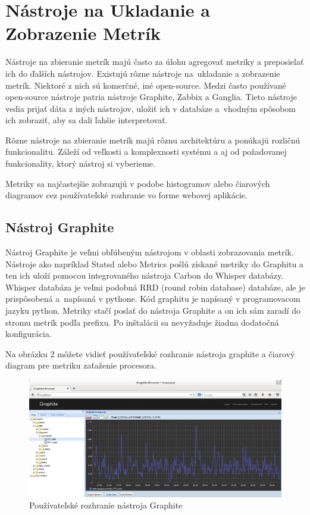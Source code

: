 \documentclass[a4paper, usesections, upjsfrontpage, thesismargins, thesislinespacing, twoside]{rnthesissvk}
\begin{document}
\newpage

\section{Nástroje na Ukladanie a Zobrazenie Metrík}

Nástroje na zbieranie metrík majú často za úlohu agregovať metriky a preposielať ich do ďalších nástrojov.
Existujú rôzne nástroje na~ukladanie a zobrazenie metrík.
Niektoré z nich sú komerčné, iné open-source.
Medzi často používané open-source nástroje patria nástroje Graphite, Zabbix a Ganglia.
Tieto nástroje vedia prijať dáta z iných nástrojov, uložiť ich v databáze a~vhodným spôsobom ich zobraziť, aby sa dali ľahšie interpretovať.

Rôzne nástroje na zbieranie metrík majú rôznu architektúru a ponúkajú rozličnú funkcionalitu.
Záleží od veľkosti a komplexnosti systému a aj od požadovanej funkcionality, ktorý nástroj si vyberieme.

Metriky sa najčastejšie zobrazujú v podobe histogramov alebo čiarových diagramov cez používateľské rozhranie vo forme webovej aplikácie.

\subsection{Nástroj Graphite}

Nástroj Graphite je veľmi obľúbeným nástrojom v oblasti zobrazovania metrík.
Nástroje ako napríklad Statsd alebo Metrics pošlú získané metriky do Graphitu a ten ich uloží pomocou integrovaného nástroja Carbon do Whisper databázy. 
Whisper databáza je veľmi podobná RRD (round robin database) databáze, ale je prispôsobená a~napísaná v pythone.
Kód graphitu je napísaný v programovacom jazyku python.
Metriky stačí poslať do nástroja Graphite a on ich sám zaradí do stromu metrík podľa prefixu.
Po inštalácii sa nevyžaduje žiadna dodatočná konfigurácia.

Na obrázku 2 môžete vidieť používaťeľské rozhranie nástroja graphite a čiarový diagram pre metriku zaťaženie procesora.

\begin{figure}
\begin{center}
\includegraphics[scale=0.41]{graphite1.png}
\caption{Používateľské rozhranie nástroja Graphite}
\end{center}
\end{figure}
\end{document}
